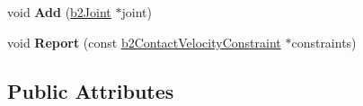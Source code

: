 \begin{DoxyCompactItemize}
\item 
\hypertarget{classb2_island_a04e6ccd0c11f6ef5a7ed0a926d081445}{void {\bfseries Add} (\hyperlink{classb2_joint}{b2\-Joint} $\ast$joint)}\label{classb2_island_a04e6ccd0c11f6ef5a7ed0a926d081445}

\item 
\hypertarget{classb2_island_a57620f76faf000f61c76e925e40e6129}{void {\bfseries Report} (const \hyperlink{structb2_contact_velocity_constraint}{b2\-Contact\-Velocity\-Constraint} $\ast$constraints)}\label{classb2_island_a57620f76faf000f61c76e925e40e6129}

\end{DoxyCompactItemize}
\subsection*{Public Attributes}
